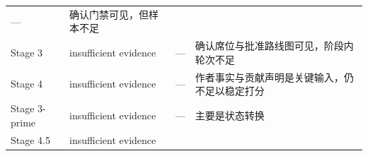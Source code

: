 \documentclass[12pt,a4paper]{article}
\begin{document}
\begin{longtable}[]{@{}llrl@{}}
\begin{minipage}[t]{0.27\columnwidth}
---\strut
\end{minipage} & \begin{minipage}[t]{0.20\columnwidth}\raggedright
确认门禁可见，但样本不足\strut
\end{minipage}\tabularnewline
\begin{minipage}[t]{0.20\columnwidth}\raggedright
Stage 3\strut
\end{minipage} & \begin{minipage}[t]{0.20\columnwidth}\raggedright
insufficient evidence\strut
\end{minipage} & \begin{minipage}[t]{0.27\columnwidth}\raggedleft
---\strut
\end{minipage} & \begin{minipage}[t]{0.20\columnwidth}\raggedright
确认席位与批准路线图可见，阶段内轮次不足\strut
\end{minipage}\tabularnewline
\begin{minipage}[t]{0.20\columnwidth}\raggedright
Stage 4\strut
\end{minipage} & \begin{minipage}[t]{0.20\columnwidth}\raggedright
insufficient evidence\strut
\end{minipage} & \begin{minipage}[t]{0.27\columnwidth}\raggedleft
---\strut
\end{minipage} & \begin{minipage}[t]{0.20\columnwidth}\raggedright
作者事实与贡献声明是关键输入，仍不足以稳定打分\strut
\end{minipage}\tabularnewline
\begin{minipage}[t]{0.20\columnwidth}\raggedright
Stage 3-prime\strut
\end{minipage} & \begin{minipage}[t]{0.20\columnwidth}\raggedright
insufficient evidence\strut
\end{minipage} & \begin{minipage}[t]{0.27\columnwidth}\raggedleft
---\strut
\end{minipage} & \begin{minipage}[t]{0.20\columnwidth}\raggedright
主要是状态转换\strut
\end{minipage}\tabularnewline
\begin{minipage}[t]{0.20\columnwidth}\raggedright
Stage 4.5\strut
\end{minipage} & \begin{minipage}[t]{0.20\columnwidth}\raggedright
insufficient evidence\strut

\end{minipage}
\end{longtable}
\end{document}
